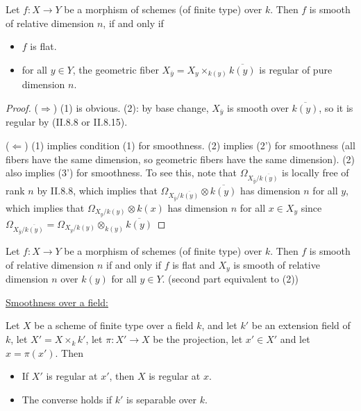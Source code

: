  \begin{theorem}
 Let $f:X\to Y$ be a morphism of schemes (of finite type) over
 $k$.  Then $f$ is smooth of relative dimension $n$, if and only
 if
 \begin{itemize}
 \item[(1)] $f$ is flat.
 \item[(2)] for all $y\in Y$, the geometric fiber $X_{\bar y} =
 X_y\times_{k(y)} \overline{k(y)}$ is regular of pure dimension
 $n$.
 \end{itemize}
 \end{theorem}
 \begin{proof}
 ($\Rightarrow$) (1) is obvious. (2): by base change, $X_{\bar y}$
 is smooth over $\overline{k(y)}$, so it is regular by (II.8.8 or
 II.8.15).

 ($\Leftarrow$) (1) implies condition (1) for smoothness.  (2)
 implies (2') for smoothness (all fibers have the same dimension,
 so geometric fibers have the same dimension).  (2) also implies
 (3') for smoothness.  To see this, note that $\Omega_{X_{\bar y}/\overline{k(y)}}$
 is locally free of rank $n$ by II.8.8, which
 implies that $\Omega_{X_{\bar y}/\overline{k(y)}} \otimes\overline{k(y)}$
  has dimension $n$ for all $y$, which implies
 that $\Omega_{X_y/k(y)}\otimes k(x)$ has dimension $n$ for all
 $x\in X_y$ since $\Omega_{X_{\bar y}/\overline{k(y)}} = \Omega_{X_y/k(y)}\otimes_{k(y)} \overline{k(y)}$
 \end{proof}

 \begin{corollary}
 Let $f:X\to Y$ be a morphism of schemes (of finite type) over
 $k$.  Then $f$ is smooth of relative dimension $n$ if and only if
 $f$ is flat and $X_y$ is smooth of relative dimension $n$ over
 $k(y)$ for all $y\in Y$. (second part equivalent to (2))
 \end{corollary}

\underline{Smoothness over a field:}

 \begin{theorem}[EGA IV 6.74a] Let $X$ be a scheme of finite type
 over a field $k$, and let $k'$ be an extension field of $k$, let
 $X'=X\times_k k'$, let $\pi:X' \to X$ be the projection, let
 $x'\in X'$ and let $x=\pi(x')$.  Then
 \begin{itemize}
 \item[(a)] If $X'$ is regular at $x'$, then $X$ is regular at
 $x$.
 \item[(b)] The converse holds if $k'$ is separable over $k$.
 \end{itemize}
 \end{theorem}

